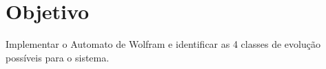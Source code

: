 
\section{Objetivo}

Implementar o Automato de Wolfram e identificar as 4 classes de evolução
possíveis para o sistema.
